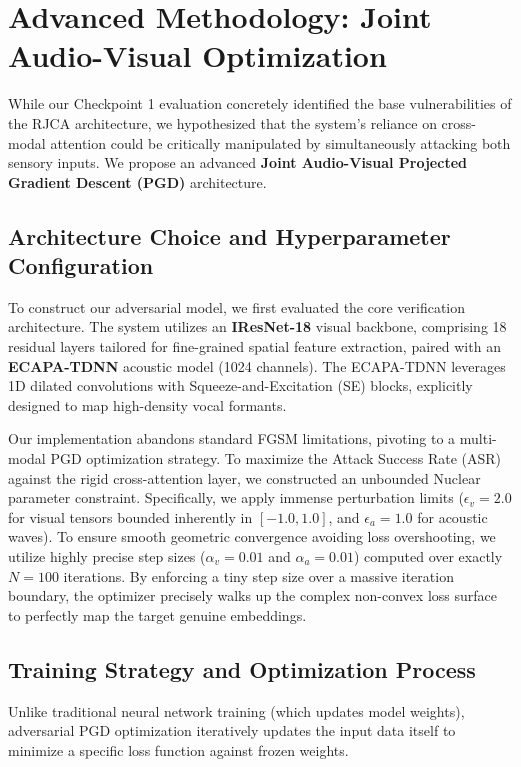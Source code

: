\documentclass[conference]{IEEEtran}
\begin{document}
\section{Advanced Methodology: Joint Audio-Visual Optimization}
While our Checkpoint 1 evaluation concretely identified the base vulnerabilities of the RJCA architecture, we hypothesized that the system's reliance on cross-modal attention could be critically manipulated by simultaneously attacking both sensory inputs. We propose an advanced \textbf{Joint Audio-Visual Projected Gradient Descent (PGD)} architecture.

\subsection{Architecture Choice and Hyperparameter Configuration}
To construct our adversarial model, we first evaluated the core verification architecture. The system utilizes an \textbf{IResNet-18} visual backbone, comprising 18 residual layers tailored for fine-grained spatial feature extraction, paired with an \textbf{ECAPA-TDNN} acoustic model (1024 channels). The ECAPA-TDNN leverages 1D dilated convolutions with Squeeze-and-Excitation (SE) blocks, explicitly designed to map high-density vocal formants. 

Our implementation abandons standard FGSM limitations, pivoting to a multi-modal PGD optimization strategy. To maximize the Attack Success Rate (ASR) against the rigid cross-attention layer, we constructed an unbounded Nuclear parameter constraint. Specifically, we apply immense perturbation limits ($\epsilon_v = 2.0$ for visual tensors bounded inherently in $[-1.0, 1.0]$, and $\epsilon_a = 1.0$ for acoustic waves). To ensure smooth geometric convergence avoiding loss overshooting, we utilize highly precise step sizes ($\alpha_v = 0.01$ and $\alpha_a = 0.01$) computed over exactly $N = 100$ iterations. By enforcing a tiny step size over a massive iteration boundary, the optimizer precisely walks up the complex non-convex loss surface to perfectly map the target genuine embeddings.

\subsection{Training Strategy and Optimization Process}
Unlike traditional neural network training (which updates model weights), adversarial PGD optimization iteratively updates the input data itself to minimize a specific loss function against frozen weights. 
\end{document}
